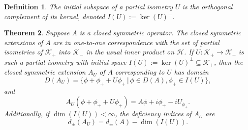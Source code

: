 \documentclass[12pt,oneside]{report}
\newtheorem{thm}{Theorem}[chapter]
\newtheorem{defn}[thm]{Definition}
\begin{document}
\begin{defn}
    The initial subspace of a partial isometry $U$ is the orthogonal complement of its kernel, denoted $I(U) := \ker(U)^{\perp}$.
\end{defn}

\begin{thm}
    Suppose $A$ is a closed symmetric operator. The closed symmetric extensions of $A$ are in one-to-one correspondence with the set of partial isometries of $\mathscr{K}_{+}$ into $\mathscr{K}_{-}$ in the usual inner product on $\mathscr{H}$. If $U: \mathscr{K}_{+} \to \mathscr{K}_{-}$ is such a partial isometry with initial space $I(U) := \ker(U)^{\perp} \subseteq \mathscr{K}_{+}$, then the closed symmetric extension $A_{U}$ of $A$ corresponding to $U$ has domain $$D(A_{U}) = \{ \phi + \phi_{+} + U\phi_{+} \, | \, \phi \in D(A), \phi_{+} \in I(U) \},$$and $$A_{U}(\phi + \phi_{+} + U\phi_{+}) = A\phi + i\phi_{+} - iU_{\phi_{+}}.$$Additionally, if $\dim(I(U)) < \infty$, the deficiency indices of $A_{U}$ are $$d_{\pm}(A_{U}) = d_{\pm}(A) - \dim(I(U)).$$
\end{thm}
\end{document}
